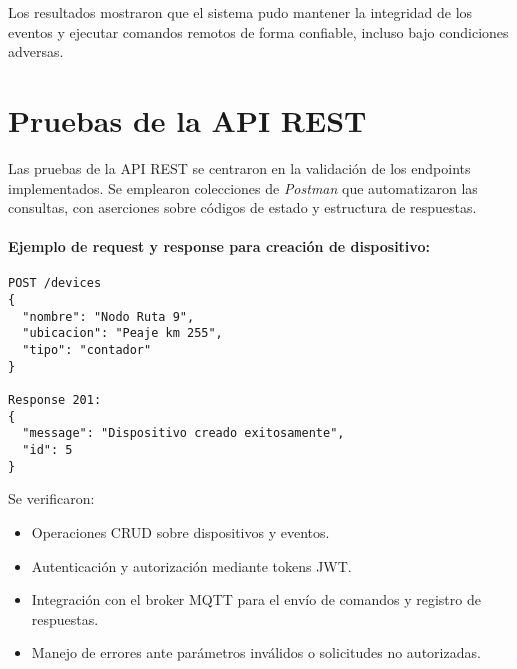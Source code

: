 Los resultados mostraron que el sistema pudo mantener la integridad de los eventos y ejecutar comandos remotos de forma confiable, incluso bajo condiciones adversas.  

\section{Pruebas de la API REST}
\label{sec:pruebas-api}

Las pruebas de la API REST se centraron en la validación de los endpoints implementados. 
Se emplearon colecciones de \textit{Postman} que automatizaron las consultas, con aserciones sobre códigos de estado y estructura de respuestas.  


\paragraph{Ejemplo de request y response para creación de dispositivo:}
\begin{verbatim}
POST /devices
{
  "nombre": "Nodo Ruta 9",
  "ubicacion": "Peaje km 255",
  "tipo": "contador"
}

Response 201:
{
  "message": "Dispositivo creado exitosamente",
  "id": 5
}
\end{verbatim}

Se verificaron:  
\begin{itemize}
    \item Operaciones CRUD sobre dispositivos y eventos.
    \item Autenticación y autorización mediante tokens JWT.
    \item Integración con el broker MQTT para el envío de comandos y registro de respuestas.
    \item Manejo de errores ante parámetros inválidos o solicitudes no autorizadas.
\end{itemize}


